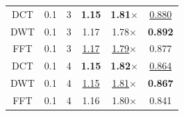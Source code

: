 \begin{table}[t!]
\begin{tiny}
\begin{tabular}{cccccc}
        \midrule
        DCT & 0.1 & 3 & \textbf{1.15} & \textbf{1.81$\times$} & \underline{0.880} \\
        DWT & 0.1 & 3 & 1.17 & 1.78$\times$ & \textbf{0.892} \\
        FFT & 0.1 & 3 & \underline{1.17} & \underline{1.79$\times$} & 0.877 \\
        \midrule
        DCT & 0.1 & 4 & \textbf{1.15} & \textbf{1.82$\times$} & \underline{0.864} \\
        DWT & 0.1 & 4 & \underline{1.15} & \underline{1.81$\times$} & \textbf{0.867} \\
        FFT & 0.1 & 4 & 1.16 & 1.80$\times$ & 0.841 \\
        \bottomrule
    \end{tabular}
    \end{tiny}
\end{table}
